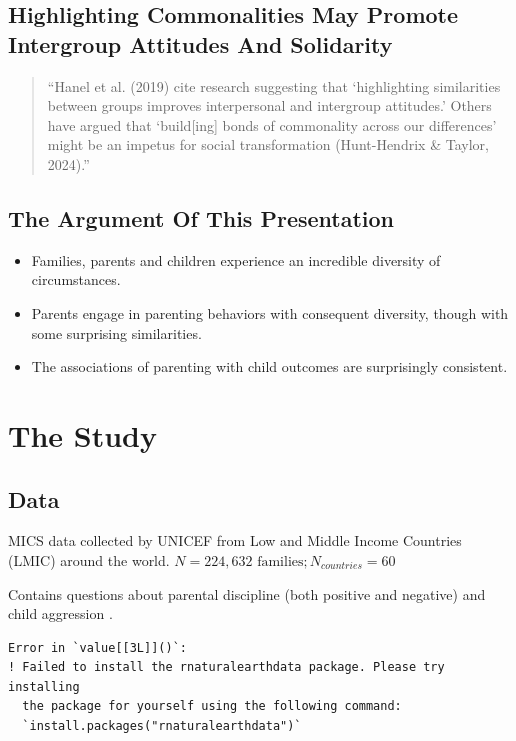 \documentclass[
  letterpaper,
  DIV=11,
  numbers=noendperiod]{scrartcl}
\providecommand{\tightlist}{%
  \setlength{\itemsep}{0pt}\setlength{\parskip}{0pt}}
\begin{document}
\subsection{Highlighting Commonalities May Promote Intergroup Attitudes
And
Solidarity}\label{highlighting-commonalities-may-promote-intergroup-attitudes-and-solidarity}

\begin{quote}
``Hanel et al. (2019) cite research suggesting that `highlighting
similarities between groups {improves interpersonal and intergroup
attitudes}.' Others have argued that `build{[}ing{]} bonds of
commonality across our differences' might be an {impetus for social
transformation} (Hunt-Hendrix \& Taylor, 2024).''
\end{quote}

\subsection{The Argument Of This
Presentation}\label{the-argument-of-this-presentation}

\begin{itemize}
\tightlist
\item
  Families, parents and children experience an incredible {diversity of
  circumstances}.
\item
  Parents engage in {parenting behaviors} with consequent diversity,
  though with some surprising similarities.
\item
  The {associations} of parenting with child outcomes are surprisingly
  consistent.
\end{itemize}

\section{The Study}\label{the-study}

\subsection{Data}\label{data}

MICS data collected by UNICEF from Low and Middle Income Countries
(LMIC) around the world.
\(N = 224,632 \text{ families}; N_{countries} = 60\)

Contains questions about {parental discipline (both positive and
negative)} and {child aggression} .

\begin{verbatim}
Error in `value[[3L]]()`:
! Failed to install the rnaturalearthdata package. Please try installing
  the package for yourself using the following command:
  `install.packages("rnaturalearthdata")`
\end{verbatim}
\end{document}
